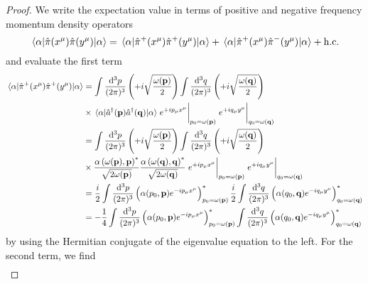 \begin{proof}
	We write the expectation value in terms of positive and negative frequency momentum density operators
	\begin{equation*}
		\expval{\hat\pi(x^\mu)\hat\pi(y^\mu)}{\alpha}
		=
		\expval{\hat\pi^+(x^\mu)\hat\pi^+(y^\mu)}{\alpha}
		+
		\expval{\hat\pi^+(x^\mu)\hat\pi^-(y^\mu)}{\alpha}
		+
		\text{h.c.}
	\end{equation*}
	and evaluate the first term
	\begin{equation*}
		\begin{split}
			\expval{\hat\pi^+(x^\mu)\hat\pi^+(y^\mu)}{\alpha}
			&=
			\int\frac{\dd[3]{p}}{(2\pi)^3}
			\left(
				+i
				\sqrt{\frac{\omega(\vb{p})}{2}}
			\right)
			\int\frac{\dd[3]{q}}{(2\pi)^3}
			\left(
				+i
				\sqrt{\frac{\omega(\vb{q})}{2}}
			\right)
			\\
			&\times
			\expval{\hat{a}^\dagger(\vb{p})\hat{a}^\dagger(\vb{q})}{\alpha}
			\eval{e^{+ip_\mu x^\mu}}_{p_0=\omega(\vb{p})}
			\eval{e^{+iq_\mu y^\mu}}_{q_0=\omega(\vb{q})}
			\\
			&=
			\int\frac{\dd[3]{p}}{(2\pi)^3}
			\left(
				+i
				\sqrt{\frac{\omega(\vb{p})}{2}}
			\right)
			\int\frac{\dd[3]{q}}{(2\pi)^3}
			\left(
				+i
				\sqrt{\frac{\omega(\vb{q})}{2}}
			\right)
			\\
			&\times
			\frac{\alpha\left(\omega(\vb{p}),\vb{p}\right)^*}{\sqrt{2\omega(\vb{p})}}
			\frac{\alpha\left(\omega(\vb{q}),\vb{q}\right)^*}{\sqrt{2\omega(\vb{q})}}
			\eval{e^{+ip_\mu x^\mu}}_{p_0=\omega(\vb{p})}
			\eval{e^{+iq_\mu y^\mu}}_{q_0=\omega(\vb{q})}
			\\
			&=
			\frac{i}{2}
			\int\frac{\dd[3]{p}}{(2\pi)^3}
			\left(
				\alpha(p_0,\vb{p})
				e^{-ip_\mu x^\mu}
			\right)^*_{p_0=\omega(\vb{p})}
			\frac{i}{2}
			\int\frac{\dd[3]{q}}{(2\pi)^3}
			\left(
				\alpha(q_0,\vb{q})
				e^{-iq_\mu y^\mu}
			\right)^*_{q_0=\omega(\vb{q})}
			\\
			&=
			-
			\frac{1}{4}
			\int\frac{\dd[3]{p}}{(2\pi)^3}
			\left(
				\alpha(p_0,\vb{p})
				e^{-ip_\mu x^\mu}
			\right)^*_{p_0=\omega(\vb{p})}
			\int\frac{\dd[3]{q}}{(2\pi)^3}
			\left(
				\alpha(q_0,\vb{q})
				e^{-iq_\mu y^\mu}
			\right)^*_{q_0=\omega(\vb{q})}
		\end{split}
	\end{equation*}
	by using the Hermitian conjugate of the eigenvalue equation  to the left.
	For the second term, we find
	\begin{equation*}
		\begin{split}

\end{split}
\end{equation*}
\end{proof}
